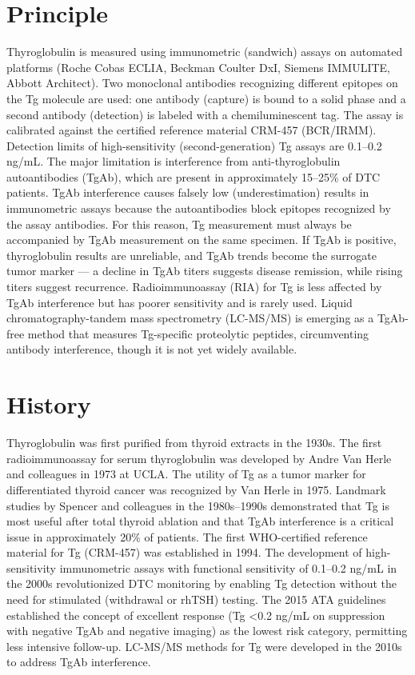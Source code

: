 \section*{Principle}
Thyroglobulin is measured using immunometric (sandwich) assays on automated platforms (Roche Cobas ECLIA, Beckman Coulter DxI, Siemens IMMULITE, Abbott Architect). Two monoclonal antibodies recognizing different epitopes on the Tg molecule are used: one antibody (capture) is bound to a solid phase and a second antibody (detection) is labeled with a chemiluminescent tag. The assay is calibrated against the certified reference material CRM-457 (BCR/IRMM). Detection limits of high-sensitivity (second-generation) Tg assays are 0.1--0.2 ng/mL. The major limitation is interference from anti-thyroglobulin autoantibodies (TgAb), which are present in approximately 15--25\% of DTC patients. TgAb interference causes falsely low (underestimation) results in immunometric assays because the autoantibodies block epitopes recognized by the assay antibodies. For this reason, Tg measurement must always be accompanied by TgAb measurement on the same specimen. If TgAb is positive, thyroglobulin results are unreliable, and TgAb trends become the surrogate tumor marker --- a decline in TgAb titers suggests disease remission, while rising titers suggest recurrence. Radioimmunoassay (RIA) for Tg is less affected by TgAb interference but has poorer sensitivity and is rarely used. Liquid chromatography-tandem mass spectrometry (LC-MS/MS) is emerging as a TgAb-free method that measures Tg-specific proteolytic peptides, circumventing antibody interference, though it is not yet widely available.

\section*{History}
Thyroglobulin was first purified from thyroid extracts in the 1930s. The first radioimmunoassay for serum thyroglobulin was developed by Andre Van Herle and colleagues in 1973 at UCLA. The utility of Tg as a tumor marker for differentiated thyroid cancer was recognized by Van Herle in 1975. Landmark studies by Spencer and colleagues in the 1980s--1990s demonstrated that Tg is most useful after total thyroid ablation and that TgAb interference is a critical issue in approximately 20\% of patients. The first WHO-certified reference material for Tg (CRM-457) was established in 1994. The development of high-sensitivity immunometric assays with functional sensitivity of 0.1--0.2 ng/mL in the 2000s revolutionized DTC monitoring by enabling Tg detection without the need for stimulated (withdrawal or rhTSH) testing. The 2015 ATA guidelines established the concept of excellent response (Tg <0.2 ng/mL on suppression with negative TgAb and negative imaging) as the lowest risk category, permitting less intensive follow-up. LC-MS/MS methods for Tg were developed in the 2010s to address TgAb interference.

